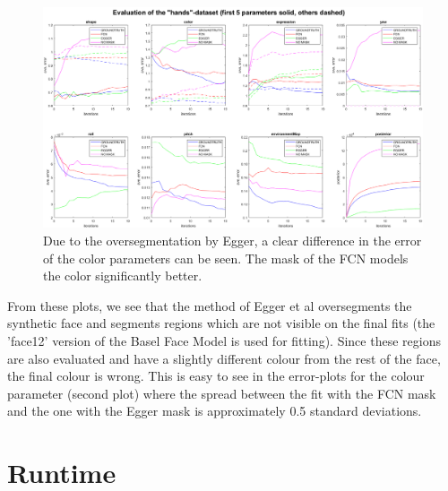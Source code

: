 \begin{figure}[H]
	\centering
	\includegraphics[angle=90,width=.55\textheight]{Figures/chap3/plot_hands_setting2.png}
	\caption{Due to the oversegmentation by Egger, a clear difference in the error of the color parameters can be seen. The mask of the FCN models the color significantly better.}
	\label{fig:chap3:plot_hands_setup2}
\end{figure}

\FloatBarrier

From these plots, we see that the method of Egger et al oversegments the synthetic face and segments regions which are not visible on the final fits (the 'face12' version of the Basel Face Model is used for fitting). Since these regions are also evaluated and have a slightly different colour from the rest of the face, the final colour is wrong. This is easy to see in the error-plots for the colour parameter (second plot) where the spread between the fit with the FCN mask and the one with the Egger mask is approximately 0.5 standard deviations.

\section{Runtime}

